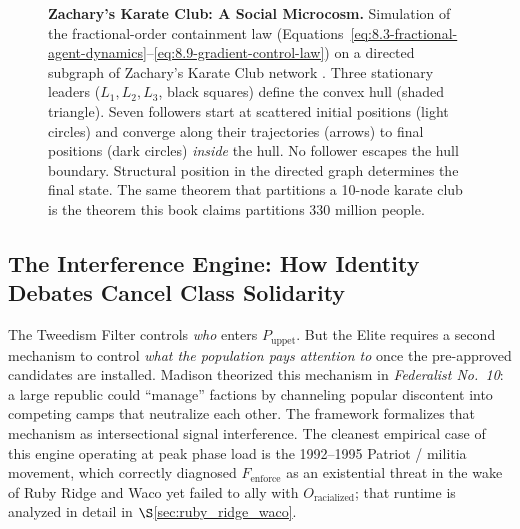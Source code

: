 \begin{figure}[htbp]
\caption{\textbf{Zachary's Karate Club: A Social Microcosm.} Simulation of the fractional-order containment law (Equations~\ref{eq:8.3-fractional-agent-dynamics}--\ref{eq:8.9-gradient-control-law}) on a directed subgraph of Zachary's Karate Club network \cite{zachary1977, kan_containment}. Three stationary leaders ($L_1, L_2, L_3$, black squares) define the convex hull (shaded triangle). Seven followers start at scattered initial positions (light circles) and converge along their trajectories (arrows) to final positions (dark circles) \textit{inside} the hull. No follower escapes the hull boundary. Structural position in the directed graph determines the final state. The same theorem that partitions a 10-node karate club is the theorem this book claims partitions 330 million people.}
\label{fig:karate_club}
\end{figure}

\subsection{The Interference Engine: How Identity Debates Cancel Class Solidarity}
\label{subsec:interference_engine}

The Tweedism Filter controls \textit{who} enters $P_{\text{uppet}}$. But the Elite requires a second mechanism to control \textit{what the population pays attention to} once the pre-approved candidates are installed. Madison theorized this mechanism in \textit{Federalist No.~10}: a large republic could ``manage'' factions by channeling popular discontent into competing camps that neutralize each other. The framework formalizes that mechanism as intersectional signal interference. The cleanest empirical case of this engine operating at peak phase load is the 1992--1995 Patriot / militia movement, which correctly diagnosed $F_{\text{enforce}}$ as an existential threat in the wake of Ruby Ridge and Waco yet failed to ally with $O_{\text{racialized}}$; that runtime is analyzed in detail in $\S$\ref{sec:ruby_ridge_waco}.

